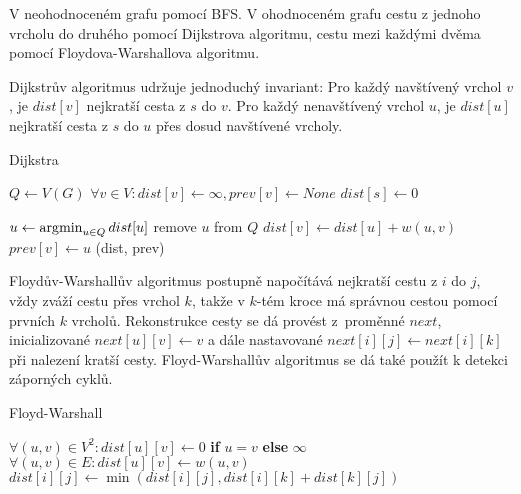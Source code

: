 V neohodnoceném grafu pomocí BFS.
V ohodnoceném grafu cestu z jednoho vrcholu do druhého pomocí Dijkstrova
algoritmu, cestu mezi každými dvěma pomocí Floydova-Warshallova
algoritmu.

Dijkstrův algoritmus udržuje jednoduchý invariant:
Pro každý navštívený vrchol $v$, je $dist[v]$ nejkratší cesta z $s$ do
$v$. Pro každý nenavštívený vrchol $u$, je $dist[u]$ nejkratší cesta z
$s$ do $u$ přes dosud navštívené vrcholy.

\begin{algorithm}[h]
\caption{Dijkstra}
\begin{algorithmic}[1]
    \State $Q \gets V(G)$
    \State $\forall v \in V : dist[v] \gets \infty, prev[v] \gets None$
    \State $dist[s] \gets 0$

        \State $u \gets \operatorname*{\arg\!\min}_{u \in Q} dist[u]$
        \State remove $u$ from $Q$
                \State $dist[v] \gets dist[u] + w(u,v) $
                \State $prev[v] \gets u$
            \EndIf
        \EndFor
    \EndWhile
    \State \Return (dist, prev)
\EndFunction
\end{algorithmic}
\end{algorithm}

Floydův-Warshallův algoritmus postupně napočítává nejkratší cestu z $i$
do $j$, vždy zváží cestu přes vrchol $k$, takže v $k$-tém kroce
má správnou cestou pomocí prvních $k$ vrcholů.
Rekonstrukce cesty se dá provést z~proměnné $next$, inicializované
$next[u][v] \gets v$ a dále nastavované $next[i][j] \gets next[i][k]$
při nalezení kratší cesty.
Floyd-Warshallův algoritmus se dá také použít k detekci záporných cyklů.

\begin{algorithm}[H]
\caption{Floyd-Warshall}
\begin{algorithmic}[1]
    \State $\forall (u,v) \in V^2 : dist[u][v] \gets 0$
        \textbf{if} $u = v$ \textbf{else} $\infty$
    \State $\forall (u,v) \in E : dist[u][v] \gets w(u,v)$
                \State $dist[i][j] \gets \min(dist[i][j], dist[i][k] + dist[k][j])$
            \EndFor
        \EndFor
    \EndFor
\EndFunction
\end{algorithmic}
\end{algorithm}

